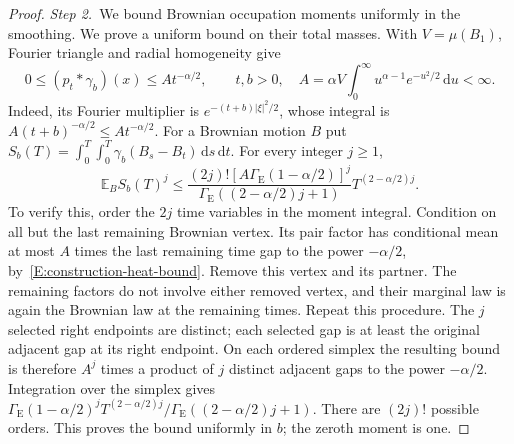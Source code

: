 \documentclass[12pt,oneside,openany]{book}
\numberwithin{equation}{section}
\theoremstyle{nogostyle}
\theoremstyle{definition}
\newcommand{\E}{\mathbb{E}}
\newcommand{\ud}{\,\mathrm{d}}
\begin{document}
\begin{proof}
  \medskip
  \noindent\textit{Step 2.~}We bound Brownian occupation moments uniformly in
  the smoothing.
  We prove a uniform bound on their total masses. With $V = \mu(B_1)$, Fourier
  triangle and radial homogeneity give
  \begin{equation}\label{E:construction-heat-bound}
    0\le(p_t*\gamma_b)(x)\le A t^{-\alpha/2},\qquad t,b>0,
    \quad A=\alpha V\int_0^\infty u^{\alpha-1}e^{-u^2/2}\ud u<\infty.
  \end{equation}
  Indeed, its Fourier multiplier is $e^{-(t+b)|\xi|^2/2}$, whose integral is
  $A(t+b)^{-\alpha/2} \le At^{-\alpha/2}$. For a Brownian motion $B$ put $S_b(T)
  = \int_0^T\int_0^T\gamma_b(B_s-B_t)\ud s\ud t$. For every integer $j \ge 1$,
  \begin{equation}\label{E:construction-brownian-moments}
    \E_B S_b(T)^j
    \le\frac{(2j)![A\Gamma_{\mathrm{E}}(1-\alpha/2)]^j}
    {\Gamma_{\mathrm{E}}((2-\alpha/2)j+1)}T^{(2-\alpha/2)j}.
  \end{equation}
  To verify this, order the $2j$ time variables in the moment integral.
  Condition on all but the last remaining Brownian vertex. Its pair factor has
  conditional mean at most $A$ times the last remaining time gap to the power
  $-\alpha/2$, by~\eqref{E:construction-heat-bound}. Remove this vertex and its
  partner. The remaining factors do not involve either removed vertex, and their
  marginal law is again the Brownian law at the remaining times. Repeat this
  procedure. The $j$ selected right endpoints are distinct; each selected gap is
  at least the original adjacent gap at its right endpoint. On each ordered
  simplex the resulting bound is therefore $A^j$ times a product of $j$ distinct
  adjacent gaps to the power $-\alpha/2$. Integration over the simplex gives
  $\Gamma_{\mathrm{E}}(1-\alpha/2)^j
  T^{(2-\alpha/2)j}/\Gamma_{\mathrm{E}}((2-\alpha/2)j+1)$. There are $(2j)!$
  possible orders. This proves the bound uniformly in $b$; the zeroth moment is
  one.



\end{proof}
\end{document}
